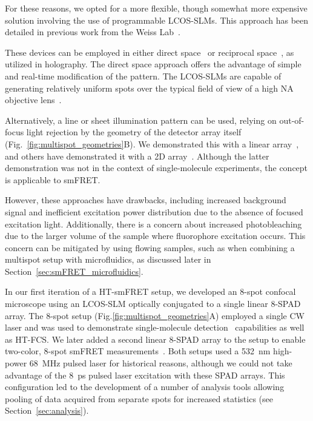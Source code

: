 For these reasons, we opted for a more flexible, though somewhat more expensive solution involving the use of programmable \ac{LCOS-SLM}s. 
This approach has been detailed in previous work from the Weiss Lab~\cite{colyer_BOE_2010,ingargiola_SPIE_2013,ingargiola_PLOS1_2016,ingargiola_JCP_2018}.

These devices can be employed in either direct space~\cite{wang_OE_2005} or reciprocal space~\cite{dufresne_RSI_2000}, as utilized in holography. 
The direct space approach offers the advantage of simple and real-time modification of the pattern. 
The \ac{LCOS-SLM}s are capable of generating relatively uniform spots over the typical field of view of a high \ac{NA} objective lens~\cite{michalet_PRSB_2013}.

Alternatively, a line or sheet illumination pattern can be used, relying on out-of-focus light rejection by the geometry of the detector array itself (Fig.~\ref{fig:multispot_geometries}B). 
We demonstrated this with a linear array~\cite{ingargiola_SPIE_2017}, and others have demonstrated it with a 2D array~\cite{buchholz_OE_2012}. 
Although the latter demonstration was not in the context of single-molecule experiments, the concept is applicable to \ac{smFRET}.

However, these approaches have drawbacks, including increased background signal and inefficient excitation power distribution due to the absence of focused excitation light. 
Additionally, there is a concern about increased photobleaching due to the larger volume of the sample where fluorophore excitation occurs. 
This concern can be mitigated by using flowing samples, such as when combining a multispot setup with microfluidics, as discussed later in Section~\ref{sec:smFRET_microfluidics}.

In our first iteration of a \ac{HT-smFRET} setup, we developed an 8-spot confocal microscope using an \ac{LCOS-SLM} optically conjugated to a single linear 8-\ac{SPAD} array. 
The 8-spot setup (Fig.\ref{fig:multispot_geometries}A) employed a single \ac{CW} laser and was used to demonstrate single-molecule detection~\cite{colyer_BOE_2010} capabilities as well as \ac{HT-FCS}. 
We later added a second linear 8-\ac{SPAD} array to the setup to enable two-color, 8-spot \ac{smFRET} measurements~\cite{ingargiola_PLOS1_2016}. 
Both setups used a 532~nm high-power 68~MHz pulsed laser for historical reasons, although we could not take advantage of the 8~ps pulsed laser excitation with these \ac{SPAD} arrays. 
This configuration led to the development of a number of analysis tools allowing pooling of data acquired from separate spots for increased statistics (see Section~\ref{sec:analysis}).

